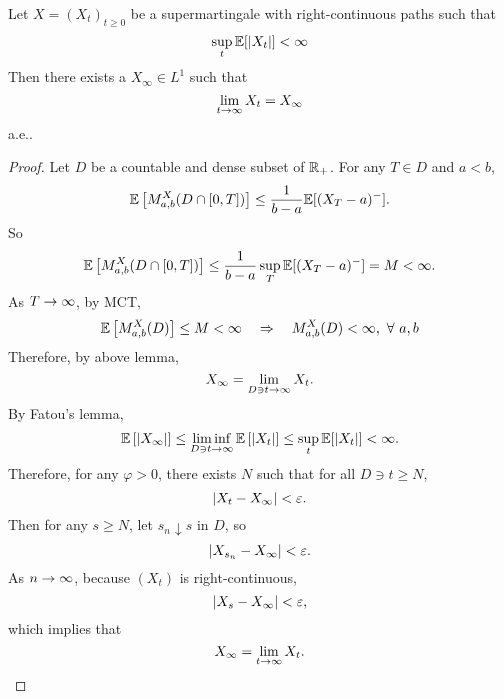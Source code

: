\begin{thm}
    Let $X = (X_t)_{t \geq 0}$ be a supermartingale with right-continuous paths such that
    \begin{equation*}
        \sup_t \mathbb{E}[\left\lvert X_t\right\lvert] < \infty
    \end{equation*}
    Then there exists a $X_\infty \in L^1$ such that
    \begin{equation*}
        \lim_{t \rightarrow \infty} X_t = X_\infty
    \end{equation*}
    a.e..
\end{thm}
\begin{proof}
    Let $D$ be a countable and dense subset of $\mathbb{R}_+$. For any $T \in D$ and $a < b$, 
    \begin{equation*}
        \mathbb{E}\left[M_{a,b}^X(D \cap [0,T])\right] \leq \frac{1}{b-a}\mathbb{E}[(X_T - a)^-].
    \end{equation*}
    So
    \begin{equation*}
        \mathbb{E}\left[M_{a,b}^X(D \cap [0,T])\right] \leq \frac{1}{b-a}\sup_T\mathbb{E}[(X_T - a)^-]  = M <\infty.
    \end{equation*}
    As $T \rightarrow \infty$, by MCT,
    \begin{equation*}
        \mathbb{E}\left[M_{a,b}^X(D)\right] \leq M < \infty\quad \Rightarrow \quad M_{a,b}^X(D) < \infty,~\forall~a,b
    \end{equation*}
    Therefore, by above lemma,
    \begin{equation*}
        X_\infty = \lim_{ D \ni t \rightarrow \infty} X_t.
    \end{equation*}
    By Fatou's lemma,
    \begin{equation*}
        \mathbb{E}\left[\left\lvert X_\infty\right\lvert\right] \leq \liminf_{D \ni t \rightarrow \infty}\mathbb{E}\left[\left\lvert X_t\right\lvert\right] \leq \sup_t \mathbb{E}[\left\lvert X_t\right\lvert] < \infty.
    \end{equation*}
    Therefore, for any $\varphi > 0$, there exists $N$ such that for all $D \ni t \geq N$,
    \begin{equation*}
        \left\lvert X_t - X_\infty\right\lvert < \varepsilon.
    \end{equation*}
    Then for any $s \geq N$, let $s_n \downarrow s$ in $D$, so
    \begin{equation*}
        \left\lvert X_{s_n} - X_\infty\right\lvert < \varepsilon.
    \end{equation*}
    As $n \rightarrow \infty$, because $(X_t)$ is right-continuous,
    \begin{equation*}
        \left\lvert X_s - X_\infty\right\lvert < \varepsilon,
    \end{equation*}
    which implies that
    \begin{equation*}
        X_\infty = \lim_{t \rightarrow \infty} X_t. \qedhere
    \end{equation*}
\end{proof}

